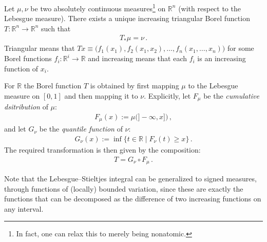     \begin{property}
        Let $\mu,\nu$ be two absolutely continuous measures\footnote{In fact, one can relax this to merely being nonatomic.} on $\mathbb{R}^n$ (with respect to the Lebesgue measure). There exists a unique increasing triangular Borel function $T:\mathbb{R}^n\rightarrow\mathbb{R}^n$ such that
        \begin{gather}
            T_\ast\mu = \nu\,.
        \end{gather}
        Triangular means that $Tx\equiv\bigl(f_1(x_1),f_2(x_1,x_2),\ldots,f_n(x_1,\ldots,x_n)\bigr)$ for some Borel functions $f_i:\mathbb{R}^i\rightarrow\mathbb{R}$ and increasing means that each $f_i$ is an increasing function of $x_i$.
    \end{property}
    \begin{remark}
        For $\mathbb{R}$ the Borel function $T$ is obtained by first mapping $\mu$ to the Lebesgue measure on $[0,1]$ and then mapping it to $\nu$. Explicitly, let $F_\mu$ be the \textit{cumulative dsitribution} of $\mu$:
        \begin{gather}
            F_\mu(x) := \mu\bigl(]-\infty,x]\bigr)\,,
        \end{gather}
        and let $G_\nu$ be the \textit{quantile function} of $\nu$:
        \begin{gather}
            G_\nu(x) := \inf\{t\in\mathbb{R}\mid F_\nu(t)\geq x\}\,.
        \end{gather}
        The required transformation is then given by the composition:
        \begin{gather}
            T = G_\nu\circ F_\mu\,.
        \end{gather}
    \end{remark}

    \begin{remark}\label{measure:bounded_variation_integral}
        Note that the Lebesgue--Stieltjes integral can be generalized to signed measures, through functions of (locally) bounded variation, since these are exactly the functions that can be decomposed as the difference of two increasing functions on any interval.
    \end{remark}
    
